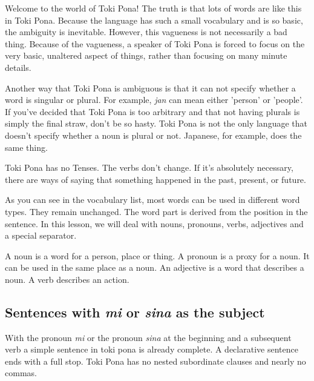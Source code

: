 Welcome to the world of Toki Pona! The truth is that lots of words are like this in Toki Pona. 
Because the language has such a small vocabulary and is so basic, the ambiguity is inevitable. 
However, this vagueness is not necessarily a bad thing. Because of the vagueness, a speaker of Toki Pona is forced to focus on the very basic, unaltered aspect of things, rather than focusing on many minute details. 

Another way that Toki Pona is ambiguous is that it can not specify whether a word is singular or plural. 
For example, \textit{jan} can mean either 'person' or 'people'. 
If you've decided that Toki Pona is too arbitrary and that not having plurals is simply the final straw, don't be so hasty. 
Toki Pona is not the only language that doesn't specify whether a noun is plural or not. 
Japanese, for example, does the same thing. 

Toki Pona has no Tenses. 
The verbs don't change. 
If it's absolutely necessary, there are ways of saying that something happened in the past, present, or future. 

As you can see in the vocabulary list, most words can be used in different word types. 
They remain unchanged. 
The word part is derived from the position in the sentence. 
In this lesson, we will deal with nouns, pronouns, verbs, adjectives and a special separator. 

A noun is a word for a person, place or thing. 
A pronoun is a proxy for a noun. It can be used in the same place as a noun. 
An adjective is a word that describes a noun. 
A verb describes an action. 
% 
\label{'predicate'}
\subsection*{Sentences with \textit{mi} or \textit{sina }as the subject}
%
With the pronoun \textit{mi} or the pronoun \textit{sina} at the beginning and a subsequent verb a simple sentence in toki pona is already complete. 
A declarative sentence ends with a full stop. 
Toki Pona has no nested subordinate clauses and nearly no commas. 


